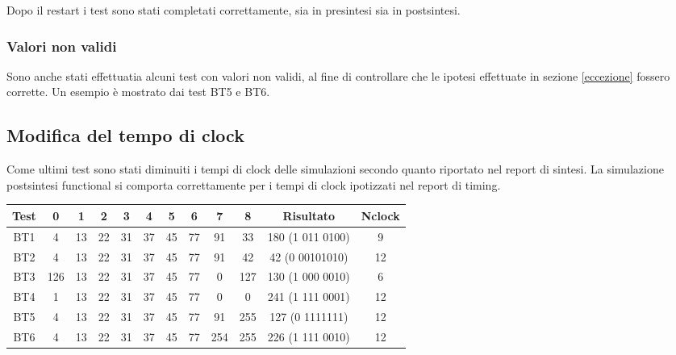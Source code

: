 Dopo il restart i test sono stati completati correttamente, sia in presintesi sia in postsintesi. 

\subsubsection{Valori non validi}
Sono anche stati effettuatia alcuni test con valori non validi, al fine di controllare che le ipotesi effettuate in sezione \ref{eccezione} fossero corrette. Un esempio \`e mostrato dai test BT5 e BT6.

\subsection{Modifica del tempo di clock}
Come ultimi test sono stati diminuiti i tempi di clock delle simulazioni secondo quanto riportato nel report di sintesi. La simulazione postsintesi functional si comporta correttamente per i tempi di clock ipotizzati nel report di timing.

\begin{center}
	\begin{tabular}[width=\textwidth]{c|c c c c c c c c c|c|c}
		Test & 0 & 1 & 2 & 3 & 4 & 5 & 6 & 7 & 8 & Risultato & Nclock \\
		\hline
		BT1 & 4 & 13 & 22 & 31 & 37 & 45 & 77 & 91 & 33 & 180 (1 011 0100) & 9 \\
		BT2 & 4 & 13 & 22 & 31 & 37 & 45 & 77 & 91 & 42 & 42 (0 00101010) & 12 \\
		BT3 & 126 & 13 & 22 & 31 & 37 & 45 & 77 & 0 & 127 & 130 (1 000 0010) & 6 \\ 
		BT4 & 1 & 13 & 22 & 31 & 37 & 45 & 77 & 0 & 0 & 241 (1 111 0001) & 12 \\
		BT5 & 4 & 13 & 22 & 31 & 37 & 45 & 77 & 91 & 255 & 127 (0 1111111) & 12 \\ 
		BT6 & 4 & 13 & 22 & 31 & 37 & 45 & 77 & 254 & 255 & 226 (1 111 0010) & 12
	\end{tabular}
\end{center}
